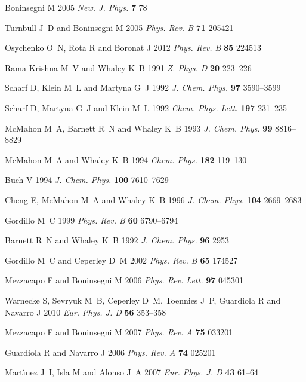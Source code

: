 \documentclass[12pt]{iopart}
\begin{document}
\begin{thebibliography}{100}
Boninsegni M 2005 {\em New. J. Phys.\/} {\bf 7} 78

Turnbull J~D and Boninsegni M 2005 {\em Phys. Rev. B\/} {\bf 71} 205421

Osychenko O~N, Rota R and Boronat J 2012 {\em Phys. Rev. B\/} {\bf 85} 224513

{Rama Krishna} M~V and Whaley K~B 1991 {\em Z. Phys. D\/} {\bf 20} 223--226

Scharf D, Klein M~L and Martyna G~J 1992 {\em J. Chem. Phys.\/} {\bf 97}
  3590--3599

Scharf D, Martyna G~J and Klein M~L 1992 {\em Chem. Phys. Lett.\/} {\bf 197}
  231--235

McMahon M~A, Barnett R~N and Whaley K~B 1993 {\em J. Chem. Phys.\/} {\bf 99}
  8816--8829

McMahon M~A and Whaley K~B 1994 {\em Chem. Phys.\/} {\bf 182} 119--130

Buch V 1994 {\em J. Chem. Phys.\/} {\bf 100} 7610--7629

Cheng E, McMahon M~A and Whaley K~B 1996 {\em J. Chem. Phys.\/} {\bf 104}
  2669--2683

Gordillo M~C 1999 {\em Phys. Rev. B\/} {\bf 60} 6790--6794

Barnett R~N and Whaley K~B 1992 {\em J. Chem. Phys.\/} {\bf 96} 2953

Gordillo M~C and Ceperley D~M 2002 {\em Phys. Rev. B\/} {\bf 65} 174527

Mezzacapo F and Boninsegni M 2006 {\em Phys. Rev. Lett.\/} {\bf 97} 045301

Warnecke S, Sevryuk M~B, Ceperley D~M, Toennies J~P, Guardiola R and Navarro J
  2010 {\em Eur. Phys. J. D\/} {\bf 56} 353--358

Mezzacapo F and Boninsegni M 2007 {\em Phys. Rev. A\/} {\bf 75} 033201

Guardiola R and Navarro J 2006 {\em Phys. Rev. A\/} {\bf 74} 025201

Mart{\'\i}nez J~I, Isla M and Alonso J~A 2007 {\em Eur. Phys. J. D\/} {\bf 43}
  61--64


\end{thebibliography}
\end{document}
